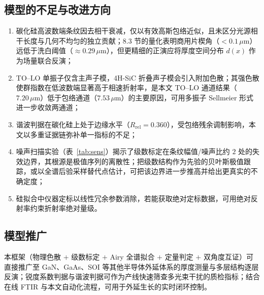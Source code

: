 \documentclass[11pt,a4paper,fontset=fandol]{ctexart}
\newcommand{\um}{\,\mu\mathrm{m}}
\begin{document}
\subsection{模型的不足与改进方向}
\begin{enumerate}[label=（\arabic*）, leftmargin=2.4em, itemsep=0.1em]
    \item 碳化硅高波数端条纹因去相干衰减，仅以有效高斯包络近似，且未区分光源相干长度与几何不均匀的独立贡献；8.3 节的量化表明商用片楔角（$<0.1\um$）远低于洗白阈值（$\approx0.29\um$），但更精细的正演应将厚度空间分布 $d(x)$ 作为场量联合反演；
    \item TO--LO 单振子仅含主声子模，4H-SiC 折叠声子模会引入附加色散；其强色散使群指数在低波数端显著高于相速折射率，是本文 TO--LO 通道结果（$7.20\um$）低于包络通道（$7.53\um$）的主要原因，可用多振子 Sellmeier 形式进一步收敛两通道；
    \item 谐波判据在碳化硅上处于边缘水平（$R_{\mathrm{rel}}=0.360$），受包络残余调制影响，本文以多重证据链弥补单一指标的不足；
    \item 噪声扫描实验（表~\ref{tab:sens}）揭示了级数标定在条纹幅值/噪声比约 $2$ 处的失效边界，其根源是极值序列的离散性；把级数结构作为先验的贝叶斯极值跟踪，或以全谱后验采样替代点估计，可把该边界进一步推高并给出更真实的不确定度；
    \item 硅拟合中仪器定标以线性冗余参数消除，若能获取绝对定标数据，可用绝对反射率约束折射率绝对量级。
\end{enumerate}

\subsection{模型推广}
本框架（物理色散 $+$ 级数标定 $+$ Airy 全谱拟合 $+$ 定量判定 $+$ 双角度互证）可直接推广至 GaN、GaAs、SOI 等其他半导体外延体系的厚度测量与多层结构逐层反演；锐度系数判据与谐波判据可作为产线快速筛查多光束干扰的质检指标；结合在线 FTIR 与本文自动化流程，可用于外延生长的实时闭环控制。
\end{document}
